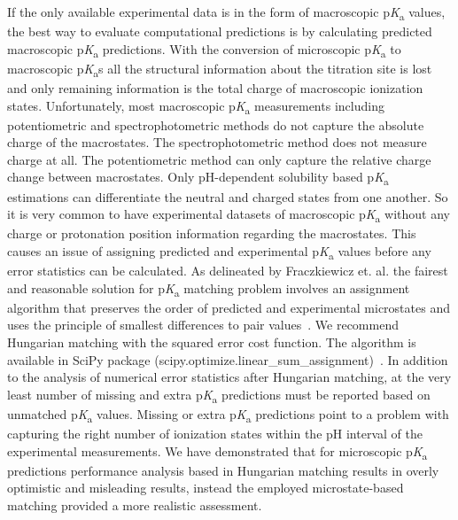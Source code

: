 \documentclass[9pt,lineno,final]{elife}
\newcommand{\pKa}{p\textit{K}\textsubscript{a}}
\begin{document}
If the only available experimental data is in the form of macroscopic \pKa{} values, the best way to evaluate computational predictions is by calculating predicted macroscopic \pKa{} predictions. With the conversion of microscopic \pKa{} to macroscopic \pKa{}s all the structural information about the titration site is lost and only remaining information is the total charge of macroscopic ionization states. Unfortunately, most macroscopic \pKa{} measurements including potentiometric and spectrophotometric methods do not capture the absolute charge of the macrostates. The spectrophotometric method does not measure charge at all. The potentiometric method can only capture the relative charge change between macrostates.  Only pH-dependent solubility based \pKa{} estimations can differentiate the neutral and charged states from one another. So it is very common to have experimental datasets of macroscopic \pKa{} without any charge or protonation position information regarding the macrostates.
This causes an issue of assigning predicted and experimental \pKa{} values before any error statistics can be calculated.
As delineated by Fraczkiewicz et. al. the fairest and reasonable solution for \pKa{} matching problem involves an assignment algorithm that preserves the order of predicted and experimental microstates and uses the principle of smallest differences to pair values~\citep{Fraczkiewicz:2013:ReferenceModuleinChemistryMolecularSciencesandChemicalEngineering}. We recommend Hungarian matching with the squared error cost function. The algorithm is available in SciPy package (scipy.optimize.linear\_sum\_assignment)~\citep{SciPy-linear-sum-assignment}.
In addition to the analysis of numerical error statistics after Hungarian matching, at the very least number of missing and extra \pKa{} predictions must be reported based on unmatched \pKa{} values. Missing or extra \pKa{} predictions point to a problem with capturing the right number of ionization states within the pH interval of the experimental measurements. We have demonstrated that for microscopic \pKa{} predictions performance analysis based in Hungarian matching results in overly optimistic and misleading results, instead the employed microstate-based matching provided a more realistic assessment. 
\end{document}
